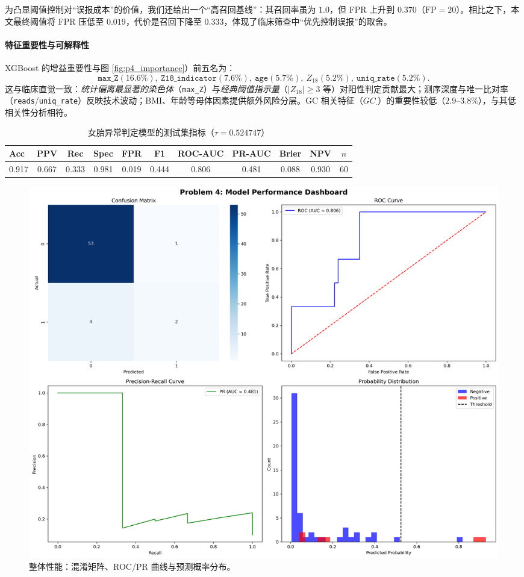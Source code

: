 \documentclass[withoutpreface]{cumcmthesis}
\begin{document}
为凸显阈值控制对“误报成本”的价值，我们还给出一个“高召回基线”：其召回率虽为 $1.0$，但 FPR 上升到 $0.370$（$\text{FP}=20$）。相比之下，本文最终阈值将 FPR 压低至 $0.019$，代价是召回下降至 $0.333$，体现了临床筛查中“优先控制误报”的取舍。

\paragraph{特征重要性与可解释性}
XGBoost 的增益重要性与图 \ref{fig:p4_importance}）前五名为：
\[
\texttt{max\_Z}(16.6\%),\ \texttt{Z18\_indicator}(7.6\%),\ \texttt{age}(5.7\%),\ Z_{18}(5.2\%),\ \texttt{uniq\_rate}(5.2\%).
\]
这与临床直觉一致：\emph{统计偏离最显著的染色体}（\texttt{max\_Z}）与\emph{经典阈值指示量}（$|Z_{18}|\!\ge3$ 等）对阳性判定贡献最大；测序深度与唯一比对率（\texttt{reads}/\texttt{uniq\_rate}）反映技术波动；BMI、年龄等母体因素提供额外风险分层。GC 相关特征（$GC_{\cdot}$）的重要性较低（$2.9$--$3.8\%$），与其低相关性分析相符。
\begin{table}[!t]
\centering
\caption{女胎异常判定模型的测试集指标（$\tau=0.524747$）}\label{tab:p4_metrics}
\begin{tabular}{lcccccccccc}
\hline
Acc & PPV & Rec & Spec & FPR & F1 & ROC-AUC & PR-AUC & Brier & NPV & $n$ \\
\hline
0.917 & 0.667 & 0.333 & 0.981 & 0.019 & 0.444 & 0.806 & 0.481 & 0.088 & 0.930 & 60 \\
\hline
\end{tabular}
\end{table}

\begin{figure}[!t]
\centering
\includegraphics[width=0.95\linewidth]{output/figures/p4_final_model_dashboard.png}
\caption{整体性能：混淆矩阵、ROC/PR 曲线与预测概率分布。}
\label{fig:p4_dashboard}
\end{figure}
\end{document}
